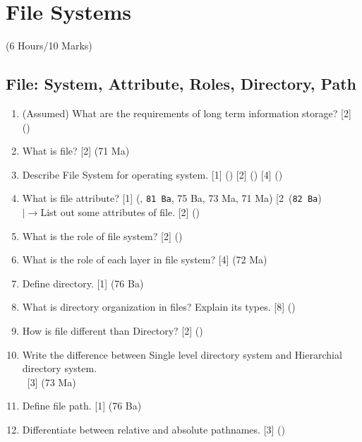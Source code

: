 \documentclass[12pt]{article}
\newcommand{\lb}{\\$\left|\rightarrow\right.$}
\newcommand{\enter}{\\\textcolor{white}{1}}
\begin{document}
	\pagebreak

\section{File Systems}
	\begin{center}(6 Hours/10 Marks)\end{center}
	\subsection{File: System, Attribute, Roles, Directory, Path}
		\begin{enumerate}[noitemsep, topsep=0pt]
			\item (Assumed) What are the requirements of long term information storage? \hfill [2] ()

			\item What is file? \hfill [2] (71 Ma)
			
			\item Describe File System for operating system. \hfill [1] () [2] () [4] ()

			\item What is file attribute? \hfill [1] (, \texttt{81 Ba}, 75 Ba, 73 Ma, 71 Ma) [2\ (\texttt{82 Ba})
			\lb List out some attributes of file. \hfill [2] ()

			\item What is the role of file system? \hfill [2] ()

			\item What is the role of each layer in file system? \hfill [4] (72 Ma)
			
			\item Define directory. \hfill [1] (76 Ba)
			
			\item What is directory organization in files? Explain its types. \hfill [8] ()

			\item How is file different than Directory? \hfill [2] ()\item Write the difference between Single level directory system and Hierarchial directory system.
				\enter\hfill [3] (73 Ma)
			
			\item Define file path. \hfill [1] (76 Ba)

			\item Differentiate between relative and absolute pathnames. \hfill [3] ()
		\end{enumerate}
\end{document}
